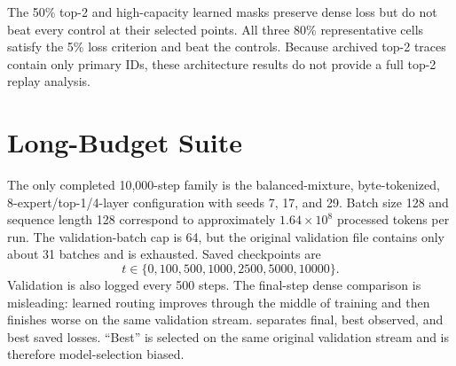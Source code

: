\documentclass{article}
\begin{document}
The 50\% top-2 and high-capacity learned masks preserve dense loss but do not
beat every control at their selected points. All three 80\% representative
cells satisfy the 5\% loss criterion and beat the controls. Because archived
top-2 traces contain only primary IDs, these architecture results do not provide
a full top-2 replay analysis.

\section{Long-Budget Suite}
\label{app:long_budget}

The only completed 10,000-step family is the balanced-mixture, byte-tokenized,
8-expert/top-1/4-layer configuration with seeds 7, 17, and 29. Batch size 128
and sequence length 128 correspond to approximately $1.64\times10^8$ processed
tokens per run. The validation-batch cap is 64, but the original validation file
contains only about 31 batches and is exhausted. Saved checkpoints are
\begin{equation}
t\in\{0,100,500,1000,2500,5000,10000\}.
\label{eq:app_long_checkpoints}
\end{equation}
Validation is also logged every 500 steps. The final-step dense comparison is
misleading: learned routing improves through the middle of training and then
finishes worse on the same validation stream. 
separates final, best observed, and best saved losses. ``Best'' is selected on
the same original validation stream and is therefore model-selection biased.

\begin{table}[t]
\centering
\scriptsize
\caption{Long-budget checkpoint comparison. Final uncertainty is sample SD;
best-observed and best-saved columns are three-seed means.}
\label{tab:app_long_checkpoint}
\end{table}
\end{document}

